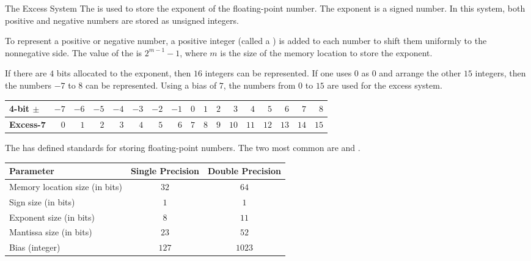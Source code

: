\documentclass[\main/notes.tex]{subfiles}
\begin{document}
				\begin{definition}{The Excess System}
					The  is used to store the exponent of the floating-point number. The exponent is a signed number. In this system, both positive and negative numbers are stored as unsigned integers.
					\begin{indentparagraph}
						To represent a positive or negative number, a positive integer (called a ) is added to each number to shift them uniformly to the nonnegative side. The value of the  is $2^{m - 1} - 1$, where $m$ is the size of the memory location to store the exponent.
					\end{indentparagraph}
				\end{definition}
				\begin{example}
					If there are $4$ bits allocated to the exponent, then $16$ integers can be represented. If one uses $0$ as $0$ and arrange the other $15$ integers, then the numbers $-7$ to $8$ can be represented. Using a bias of $7$, the numbers from $0$ to $15$ are used for the excess system.
					\begin{center}
						\begin{tabular}{lrrrrrrrrrrrrrrrr}
							\textbf{4-bit $\pm$} & $-7$ & $-6$ & $-5$ & $-4$ & $-3$ & $-2$ & $-1$ & $0$ &
							$1$ & $2$ & $3$ & $4$ & $5$ & $6$ & $7$ & $8$\\
							\midrule
							\textbf{Excess-7} & $0$ & $1$ & $2$ & $3$ & $4$ & $5$ & $6$ & $7$ & 
							$8$ & $9$ & $10$ & $11$ & $12$ & $13$ & $14$ & $15$\\
						\end{tabular}
					\end{center}
				\end{example}
				The  has defined standards for storing floating-point numbers. The two most common are  and .
				\begin{center}
					\begin{tabular}{lcc}
						\toprule
						Parameter & Single Precision & Double Precision\\
						\midrule
						Memory location size (in bits) & $32$ & $64$\\
						Sign size (in bits) & $1$ & $1$\\
						Exponent size (in bits) & $8$ & $11$\\
						Mantissa size (in bits) & $23$ & $52$\\
						Bias (integer) & $127$ & $1023$\\
						\bottomrule
					\end{tabular}
				\end{center}
\end{document}
